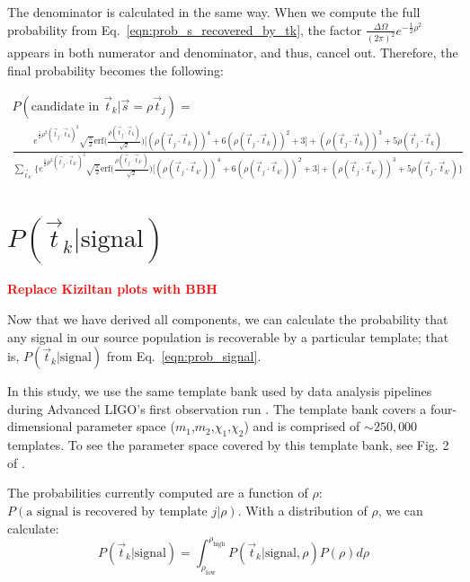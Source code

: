 \documentclass[twocolumn,showpacs,unsortedaddress,superscriptaddress,showkeys,nofootinbib,preprintnumbers,letterpaper]{revtex4-1}
\newcommand{\FIXME}[1]{\textcolor{red}{\textbf{#1}}}
\newcommand{\ptjtk}{\rho(\vec{t}_j\cdot\vec{t}_k)}
\newcommand{\tjtk}{(\vec{t}_j\cdot\vec{t}_k)}
\newcommand{\tjtkk}{(\vec{t}_j\cdot\vec{t}_{k'})}
\newcommand{\ptjtkk}{\rho(\vec{t}_j\cdot\vec{t}_{k'})}
\begin{document}
The denominator is calculated in the same way. When we compute the full probability from Eq.~\ref{eqn:prob_s_recovered_by_tk}, the factor $\frac{\Delta\Omega}{(2\pi)^{2}} e^{-\frac{1}{2}\rho^2}$ appears in both numerator and denominator, and thus, cancel out. Therefore, the final probability becomes the following:
	\begin{widetext}
	\begin{multline}
	P(\text{candidate in }\vec{t}_k|\vec{s}=\rho\vec{t}_j) =\\
	\frac{
	e^{\frac{1}{2}\rho^2\tjtk^2}
	\sqrt{\frac{\pi}{2}}\text{erf}\Big(\frac{\ptjtk}{\sqrt{2}}\Big)\Big[(\ptjtk)^4+6(\ptjtk)^2+3\Big]
	      + (\ptjtk)^3+5\ptjtk
	}{
	{\sum_{\vec{t}_{k'}} \Big\{e^{\frac{1}{2}\rho^2\tjtkk^2} 
	\sqrt{\frac{\pi}{2}}\text{erf}\Big(\frac{\ptjtkk}{\sqrt{2}}\Big)\Big[(\ptjtkk)^4+6(\ptjtkk)^2+3\Big]
	      + (\ptjtkk)^3+5\ptjtkk
	\Big\}
	}}
	\label{eqn:p_k}
	\end{multline}
	\end{widetext}


\section{$P(\vec{t}_k | \text{signal})$} \label{sec:P_jk}

\FIXME{Replace Kiziltan plots with BBH}

Now that we have derived all components, we can calculate the probability that any signal in our source population is recoverable by a particular template; that is, $P(\vec{t}_k | \text{signal})$ from Eq.~\ref{eqn:prob_signal}.

In this study, we use the same template bank used by data analysis pipelines during Advanced LIGO's first observation run \cite{TheLIGOScientific:2016pea}. The template bank covers a four-dimensional parameter space ($m_1$,$m_2$,$\chi_1$,$\chi_2$) and is comprised of $\sim\!250,000$ templates. To see the parameter space covered by this template bank, see Fig. 2 of \cite{TheLIGOScientific:2016pea}.

The probabilities currently computed are a function of $\rho$: $P(\text{a signal is recovered by template }j|\rho)$. With a distribution of $\rho$, we can calculate:
	\begin{equation}
	P(\vec{t}_k|\text{signal}) = \int_{\rho_{\text{low}}}^{\rho_{\text{high}}} P(\vec{t}_k|\text{signal},\rho) P(\rho) d\rho
	\end{equation}
\end{document}
